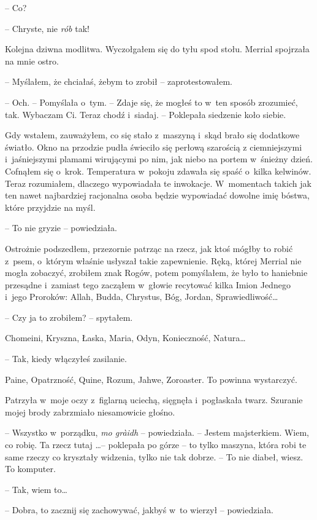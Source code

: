\documentclass[oneside,polish,11pt,sfheadings]{mwbk}
\begin{document}
-- Co?

-- Chryste, nie \textit{rób} tak!

Kolejna dziwna modlitwa. Wyczołgałem się do tyłu spod stołu. Merrial
spojrzała na mnie ostro.

-- Myślałem, że chciałaś, żebym to zrobił -- zaprotestowałem.

-- Och. -- Pomyślała o~tym. -- Zdaje się, że mogłeś to w~ten sposób
zrozumieć, tak. Wybaczam Ci. Teraz chodź i~siadaj. -- Poklepała siedzenie
koło siebie.

Gdy wstałem, zauważyłem, co się stało z~maszyną i~skąd brało się
dodatkowe światło. Okno na przodzie pudła świeciło się perłową szarością
z ciemniejszymi i~jaśniejszymi plamami wirującymi po nim, jak niebo na
portem w~śnieżny dzień. Cofnąłem się o~krok. Temperatura w~pokoju
zdawała się spaść o~kilka kelwinów. Teraz rozumiałem, dlaczego
wypowiadała te inwokacje. W~momentach takich jak ten nawet najbardziej
racjonalna osoba będzie wypowiadać dowolne imię bóstwa, które przyjdzie
na myśl.

-- To nie gryzie -- powiedziała.

Ostrożnie podszedłem, przezornie patrząc na rzecz, jak ktoś mógłby to
robić z~psem, o~którym właśnie usłyszał takie zapewnienie. Ręką, której
Merrial nie mogła zobaczyć, zrobiłem znak Rogów, potem pomyślałem, że
było to haniebnie przesądne i~zamiast tego zacząłem w~głowie recytować
kilka Imion Jednego i~jego Proroków: Allah, Budda, Chrystus, Bóg,
Jordan, Sprawiedliwość\ldots

-- Czy ja to zrobiłem? -- spytałem.

Chomeini, Kryszna, Łaska, Maria, Odyn, Konieczność, Natura\ldots

-- Tak, kiedy włączyłeś zasilanie.

Paine, Opatrzność, Quine, Rozum, Jahwe, Zoroaster. To powinna
wystarczyć.

Patrzyła w~moje oczy z~figlarną uciechą, sięgnęła i~pogłaskała twarz.
Szuranie mojej brody zabrzmiało niesamowicie głośno.

-- Wszystko w~porządku, \textit{mo gràidh} -- powiedziała. -- Jestem majsterkiem. Wiem, co robię. Ta
rzecz tutaj \ldots -- poklepała po górze -- to tylko maszyna, która robi te
same rzeczy co kryształy widzenia, tylko nie tak dobrze. -- To nie
diabeł, wiesz. To komputer.

-- Tak, wiem to\ldots

-- Dobra, to zacznij się zachowywać, jakbyś w~to wierzył -- powiedziała.
\end{document}
